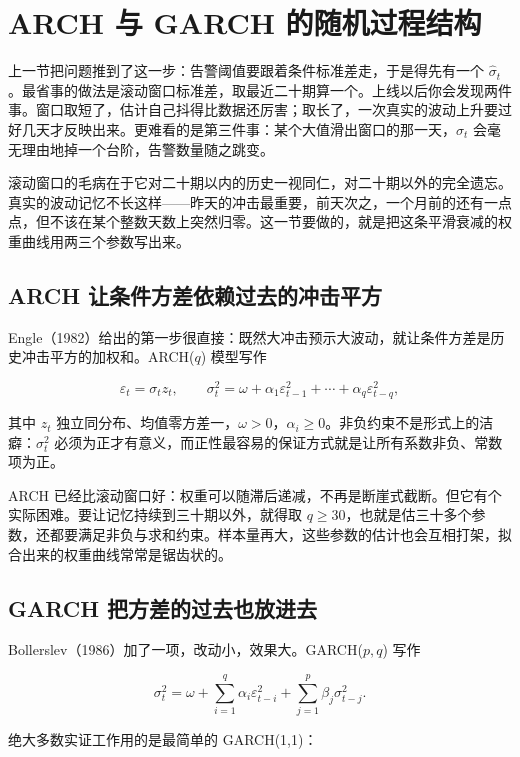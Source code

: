 \section{ARCH 与 GARCH 的随机过程结构}
\label{sec:11-Mathematical-Statistics/10-GARCH-and-Volatility/02}

上一节把问题推到了这一步：告警阈值要跟着条件标准差走，于是得先有一个 \(\hat\sigma_t\)。最省事的做法是滚动窗口标准差，取最近二十期算一个。上线以后你会发现两件事。窗口取短了，估计自己抖得比数据还厉害；取长了，一次真实的波动上升要过好几天才反映出来。更难看的是第三件事：某个大值滑出窗口的那一天，\(\hat\sigma_t\) 会毫无理由地掉一个台阶，告警数量随之跳变。

滚动窗口的毛病在于它对二十期以内的历史一视同仁，对二十期以外的完全遗忘。真实的波动记忆不长这样——昨天的冲击最重要，前天次之，一个月前的还有一点点，但不该在某个整数天数上突然归零。这一节要做的，就是把这条平滑衰减的权重曲线用两三个参数写出来。

\subsection{ARCH 让条件方差依赖过去的冲击平方}

Engle（1982）给出的第一步很直接：既然大冲击预示大波动，就让条件方差是历史冲击平方的加权和。ARCH(\(q\)) 模型写作

\[
\varepsilon_t=\sigma_tz_t,
\qquad
\sigma_t^2=\omega+\alpha_1\varepsilon_{t-1}^2+\cdots+\alpha_q\varepsilon_{t-q}^2,
\]

其中 \(z_t\) 独立同分布、均值零方差一，\(\omega>0\)，\(\alpha_i\ge0\)。非负约束不是形式上的洁癖：\(\sigma_t^2\) 必须为正才有意义，而正性最容易的保证方式就是让所有系数非负、常数项为正。

ARCH 已经比滚动窗口好：权重可以随滞后递减，不再是断崖式截断。但它有个实际困难。要让记忆持续到三十期以外，就得取 \(q\ge 30\)，也就是估三十多个参数，还都要满足非负与求和约束。样本量再大，这些参数的估计也会互相打架，拟合出来的权重曲线常常是锯齿状的。

\subsection{GARCH 把方差的过去也放进去}

Bollerslev（1986）加了一项，改动小，效果大。GARCH(\(p,q\)) 写作

\[
\sigma_t^2=\omega+\sum_{i=1}^q\alpha_i\varepsilon_{t-i}^2+\sum_{j=1}^p\beta_j\sigma_{t-j}^2 .
\]

绝大多数实证工作用的是最简单的 GARCH(1,1)：

